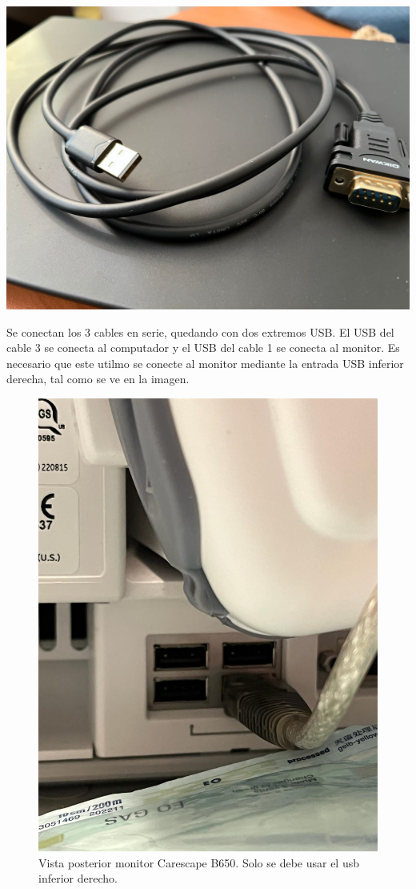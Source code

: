 \documentclass{article}
\begin{document}
\begin{enumerate}
	\includegraphics*[scale=0.12]{img/rs232_macho_a_usb.jpeg}

\end{enumerate}

Se conectan los 3 cables en serie, quedando con dos extremos USB. El USB del cable 3 se conecta al computador y el USB del cable 1 se conecta al monitor. Es necesario que este utilmo se conecte al monitor mediante la entrada USB inferior derecha, tal como se ve en la imagen.

\begin{figure}[h]
	\centering
	\includegraphics[scale=0.2]{img/b650_rear_panel.png}
	\caption{Vista posterior monitor Carescape B650. Solo se debe usar el usb inferior derecho.}
	\label{fig:b650_posterior}
\end{figure}
\end{document}
